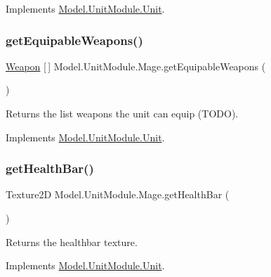 Implements \hyperlink{interface_model_1_1_unit_module_1_1_unit_accb79e396c6066707f2d11f63e3fdd99}{Model.\+Unit\+Module.\+Unit}.

\hypertarget{class_model_1_1_unit_module_1_1_mage_a97144d7360321515956ebb92e8bd0caf}{}\label{class_model_1_1_unit_module_1_1_mage_a97144d7360321515956ebb92e8bd0caf} 
\subsubsection{\texorpdfstring{get\+Equipable\+Weapons()}{getEquipableWeapons()}}
{\footnotesize\ttfamily \hyperlink{interface_model_1_1_weapon_module_1_1_weapon}{Weapon} \mbox{[}$\,$\mbox{]} Model.\+Unit\+Module.\+Mage.\+get\+Equipable\+Weapons (\begin{DoxyParamCaption}{ }\end{DoxyParamCaption})\hspace{0.3cm}{\ttfamily [inline]}}

Returns the list weapons the unit can equip (T\+O\+DO). 

Implements \hyperlink{interface_model_1_1_unit_module_1_1_unit_a7b64e60f28d516a5fb4e28a9b7cd8eec}{Model.\+Unit\+Module.\+Unit}.

\hypertarget{class_model_1_1_unit_module_1_1_mage_af816450e9803b56a1bf97bb9f04c2008}{}\label{class_model_1_1_unit_module_1_1_mage_af816450e9803b56a1bf97bb9f04c2008} 
\subsubsection{\texorpdfstring{get\+Health\+Bar()}{getHealthBar()}}
{\footnotesize\ttfamily Texture2D Model.\+Unit\+Module.\+Mage.\+get\+Health\+Bar (\begin{DoxyParamCaption}{ }\end{DoxyParamCaption})\hspace{0.3cm}{\ttfamily [inline]}}

Returns the healthbar texture. 

Implements \hyperlink{interface_model_1_1_unit_module_1_1_unit_a5be18da3857bb22525feb89dd49b76b1}{Model.\+Unit\+Module.\+Unit}.


